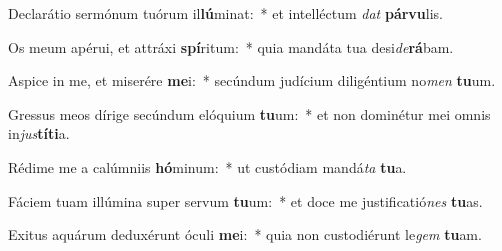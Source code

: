 \item Declarátio sermónum tuórum il\textbf{lú}minat:~* et intelléctum \textit{dat} \textbf{pár}\textbf{vu}lis.
\item Os meum apérui, et attráxi \textbf{spí}ritum:~* quia mandáta tua desi\textit{de}\textbf{rá}bam.
\item Aspice in me, et miserére \textbf{me}i:~* secúndum judícium diligéntium no\textit{men} \textbf{tu}um.
\item Gressus meos dírige secúndum elóquium \textbf{tu}um:~* et non dominétur mei omnis in\textit{jus}\textbf{tí}\textbf{ti}a.
\item Rédime me a calúmniis \textbf{hó}minum:~* ut custódiam mandá\textit{ta} \textbf{tu}a.
\item Fáciem tuam illúmina super servum \textbf{tu}um:~* et doce me justificatió\textit{nes} \textbf{tu}as.
\item Exitus aquárum deduxérunt óculi \textbf{me}i:~* quia non custodiérunt le\textit{gem} \textbf{tu}am.
